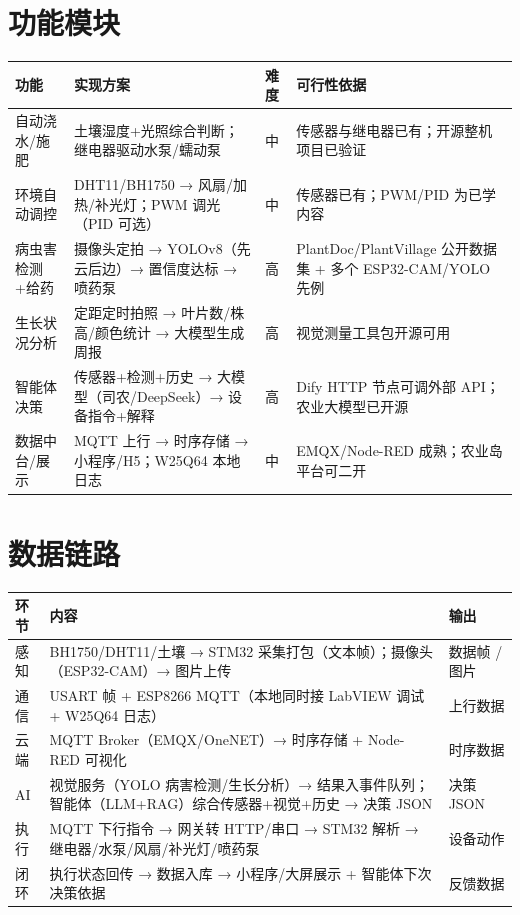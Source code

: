 \documentclass[11pt]{ctexart}
\begin{document}
\section{功能模块}
\begin{longtable}{p{2.2cm}p{5.4cm}p{0.9cm}p{4.4cm}}
  \toprule
  功能 & 实现方案 & 难度 & 可行性依据 \\
  \midrule
  自动浇水/施肥 & 土壤湿度+光照综合判断；继电器驱动水泵/蠕动泵 & 中 & 传感器与继电器已有；开源整机项目已验证 \\
  环境自动调控 & DHT11/BH1750 → 风扇/加热/补光灯；PWM 调光（PID 可选） & 中 & 传感器已有；PWM/PID 为已学内容 \\
  病虫害检测+给药 & 摄像头定拍 → YOLOv8（先云后边）→ 置信度达标 → 喷药泵 & 高 & PlantDoc/PlantVillage 公开数据集 + 多个 ESP32-CAM/YOLO 先例 \\
  生长状况分析 & 定距定时拍照 → 叶片数/株高/颜色统计 → 大模型生成周报 & 高 & 视觉测量工具包开源可用 \\
  智能体决策 & 传感器+检测+历史 → 大模型（司农/DeepSeek）→ 设备指令+解释 & 高 & Dify HTTP 节点可调外部 API；农业大模型已开源 \\
  数据中台/展示 & MQTT 上行 → 时序存储 → 小程序/H5；W25Q64 本地日志 & 中 & EMQX/Node-RED 成熟；农业岛平台可二开 \\
  \bottomrule
\end{longtable}

\section{数据链路}
\begin{longtable}{p{1.5cm}p{11.0cm}p{2.6cm}}
  \toprule
  环节 & 内容 & 输出 \\
  \midrule
  感知 & BH1750/DHT11/土壤 → STM32 采集打包（文本帧）；摄像头（ESP32-CAM）→ 图片上传 & 数据帧 / 图片 \\
  通信 & USART 帧 + ESP8266 MQTT（本地同时接 LabVIEW 调试 + W25Q64 日志） & 上行数据 \\
  云端 & MQTT Broker（EMQX/OneNET）→ 时序存储 + Node-RED 可视化 & 时序数据 \\
  AI & 视觉服务（YOLO 病害检测/生长分析）→ 结果入事件队列；智能体（LLM+RAG）综合传感器+视觉+历史 → 决策 JSON & 决策 JSON \\
  执行 & MQTT 下行指令 → 网关转 HTTP/串口 → STM32 解析 → 继电器/水泵/风扇/补光灯/喷药泵 & 设备动作 \\
  闭环 & 执行状态回传 → 数据入库 → 小程序/大屏展示 + 智能体下次决策依据 & 反馈数据 \\
  \bottomrule
\end{longtable}
\end{document}
